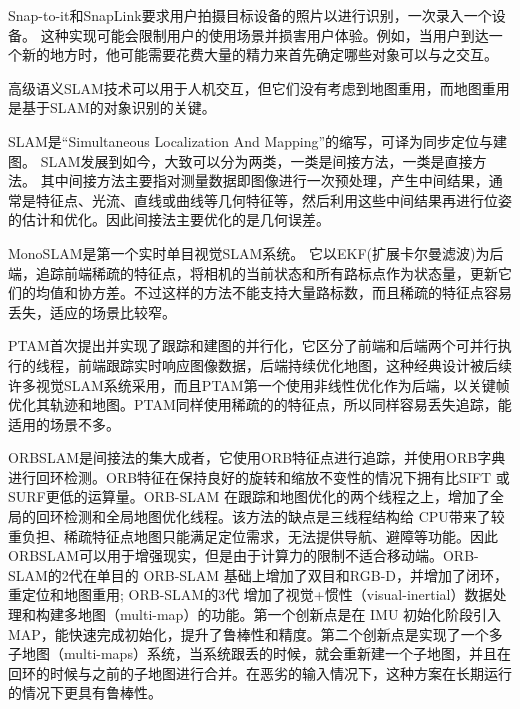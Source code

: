 Snap-to-it\cite{de2016snap}和SnapLink\cite{chen2018snaplink}要求用户拍摄目标设备的照片以进行识别，一次录入一个设备。
这种实现可能会限制用户的使用场景并损害用户体验。例如，当用户到达一个新的地方时，他可能需要花费大量的精力来首先确定哪些对象可以与之交互。

高级语义SLAM技术\cite{strecke2019fusion,runz2018maskfusion,salas2013slam++}可以用于人机交互，但它们没有考虑到地图重用，而地图重用是基于SLAM的对象识别的关键。


SLAM是“Simultaneous Localization And Mapping”的缩写，可译为同步定位与建图。
SLAM发展到如今，大致可以分为两类，一类是间接方法，一类是直接方法。
其中间接方法主要指对测量数据即图像进行一次预处理，产生中间结果，通常是特征点、光流、直线或曲线等几何特征等，然后利用这些中间结果再进行位姿的估计和优化。因此间接法主要优化的是几何误差。

MonoSLAM\cite{DavReiMol07}是第一个实时单目视觉SLAM系统。 它以EKF(扩展卡尔曼滤波)为后端，追踪前端稀疏的特征点，将相机的当前状态和所有路标点作为状态量，更新它们的均值和协方差。不过这样的方法不能支持大量路标数，而且稀疏的特征点容易丢失，适应的场景比较窄。

PTAM\cite{KleMur07}首次提出并实现了跟踪和建图的并行化，它区分了前端和后端两个可并行执行的线程，前端跟踪实时响应图像数据，后端持续优化地图，这种经典设计被后续许多视觉SLAM系统采用，而且PTAM第一个使用非线性优化作为后端，以关键帧优化其轨迹和地图。PTAM同样使用稀疏的的特征点，所以同样容易丢失追踪，能适用的场景不多。

ORBSLAM\cite{MurMonTar15}是间接法的集大成者，它使用ORB特征点进行追踪，并使用ORB字典进行回环检测。ORB特征在保持良好的旋转和缩放不变性的情况下拥有比SIFT 或 SURF更低的运算量。ORB-SLAM 在跟踪和地图优化的两个线程之上，增加了全局的回环检测和全局地图优化线程。该方法的缺点是三线程结构给 CPU带来了较重负担、稀疏特征点地图只能满足定位需求，无法提供导航、避障等功能。因此ORBSLAM可以用于增强现实，但是由于计算力的限制不适合移动端。ORB-SLAM的2代\cite{MurTar17}在单目的 ORB-SLAM 基础上增加了双目和RGB-D，并增加了闭环，重定位和地图重用; ORB-SLAM的3代\cite{CamElvRod20} 增加了视觉+惯性（visual-inertial）数据处理和构建多地图（multi-map）的功能。第一个创新点是在 IMU 初始化阶段引入 MAP，能快速完成初始化，提升了鲁棒性和精度。第二个创新点是实现了一个多子地图（multi-maps）系统，当系统跟丢的时候，就会重新建一个子地图，并且在回环的时候与之前的子地图进行合并。在恶劣的输入情况下，这种方案在长期运行的情况下更具有鲁棒性。

